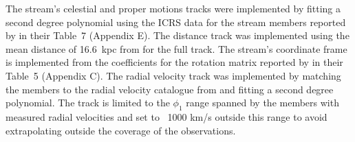 The stream's celestial and proper motions tracks were implemented by fitting a second degree polynomial using the ICRS data for the stream members reported by \citet{Shipp2019} in their Table~7 (Appendix E). The distance track was implemented using the mean distance of 16.6~kpc from \citet{Shipp2018} for the full track. The stream's coordinate frame is implemented from the coefficients for the rotation matrix reported by \citet{Shipp2019} in their Table~5 (Appendix C). The radial velocity track was implemented by matching the \citet{Shipp2019} members to the radial velocity catalogue from \citet{Li2022} and fitting a second degree polynomial. The track is limited to the $\phi_1$ range spanned by the members with measured radial velocities and set to ~1000 km/s outside this range to avoid extrapolating outside the coverage of the observations.
